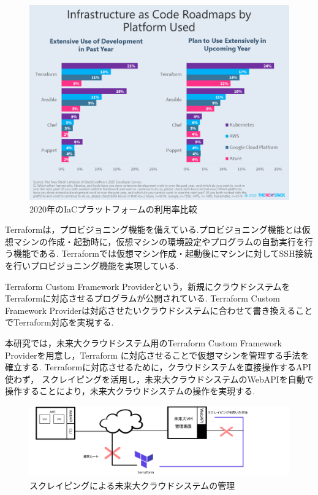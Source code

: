 \documentclass[11pt]{ujarticle}\sloppy
\begin{document}
\begin{figure}[h]
	\includegraphics[width=1\linewidth]{./images/terraform.png}
	\caption{2020年のIaCプラットフォームの利用率比較\cite{THENEWSTACK}}
	\label{fig:terraform}
\end{figure}

Terraformは，プロビジョニング機能を備えている.プロビジョニング機能とは仮想マシンの作成・起動時に，仮想マシンの環境設定やプログラムの自動実行を行う機能である.
Terraformでは仮想マシン作成・起動後にマシンに対してSSH接続を行いプロビジョニング機能を実現している.

Terraform Custom Framework Providerという，新規にクラウドシステムをTerraformに対応させるプログラムが公開されている.
Terraform Custom Framework Providerは対応させたいクラウドシステムに合わせて書き換えることでTerraform対応を実現する.


本研究では，未来大クラウドシステム用のTerraform Custom Framework Providerを用意し，Terraform に対応させることで仮想マシンを管理する手法を確立する.
Terraformに対応させるために，クラウドシステムを直接操作するAPI使わず，
スクレイピングを活用し，未来大クラウドシステムのWebAPIを自動で操作することにより，未来大クラウドシステムの操作を実現する.


\begin{figure}[h]
	\includegraphics[width=1\linewidth]{./images/scraping.png}
	\caption{スクレイピングによる未来大クラウドシステムの管理}
	\label{fig:scraping}
\end{figure}
\end{document}
